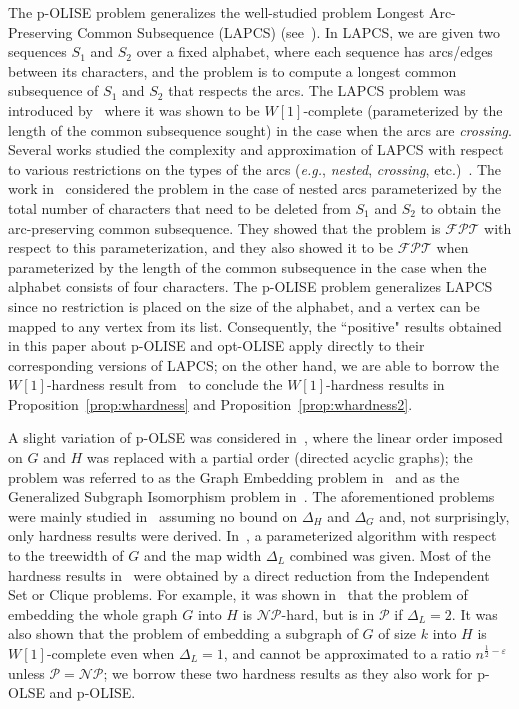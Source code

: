 \documentclass[11pt]{article}
\newcommand{\Pol}{\mbox{$\mathcal P$}}
\newcommand{\NP}{\mbox{$\mathcal{NP}$}}
\newcommand{\FPT}{\text{$\mathcal{FPT}$}}
\let\epsilon=\varepsilon
\def\eg{{\em e.g.}}
\begin{document}
The p-OLISE problem generalizes the well-studied problem {\sc Longest Arc-Preserving Common Subsequence} (LAPCS) (see~\cite{gramm,evansphd,evans,guo,guohuidam,guohui}).  In LAPCS, we are given two sequences $S_1$ and $S_2$ over a fixed alphabet, where each sequence has arcs/edges between its characters, and the problem is to compute a longest common subsequence of $S_1$ and $S_2$ that respects the arcs. The LAPCS problem was introduced by~\cite{evansphd,evans} where it was shown to be $W[1]$-complete (parameterized by the length of the common subsequence sought) in the case when the arcs are {\em crossing}. Several works studied the complexity and approximation of LAPCS with respect to various restrictions on the types of the arcs (\eg, {\em nested}, {\em crossing}, etc.)~\cite{gramm,evansphd,evans,guo,guohuidam,guohui}. The work in~\cite{gramm,guo} considered the problem in the case of nested arcs parameterized by the total number of characters that need to be deleted from $S_1$ and $S_2$ to obtain the arc-preserving common subsequence. They showed that the problem is $\FPT$ with respect to this parameterization, and they also showed it to be $\FPT$ when parameterized by the length of the common subsequence in the case when the alphabet consists of four characters. The p-OLISE problem generalizes LAPCS since no restriction is placed on the size of the alphabet, and a vertex can be mapped to any vertex from its list. Consequently, the ``positive" results obtained in this paper about p-OLISE and opt-OLISE apply directly to their corresponding versions of LAPCS; on the other hand, we are able to borrow the $W[1]$-hardness result from~\cite{evans} to conclude the $W[1]$-hardness results in Proposition~\ref{prop:whardness} and Proposition~\ref{prop:whardness2}.

A slight variation of p-OLSE was considered in~\cite{xiuzhen,xiuzhencai}, where the linear order imposed on $G$ and $H$ was replaced with a partial order (directed acyclic graphs); the problem was referred to as the {\sc Graph Embedding} problem in~\cite{xiuzhen} and as the {\sc Generalized Subgraph Isomorphism} problem in~\cite{xiuzhencai}. The aforementioned problems were mainly studied in~\cite{xiuzhen,xiuzhencai} assuming no bound on $\Delta_H$ and $\Delta_G$ and, not surprisingly, only hardness results were derived. In~\cite{xiuzhencai}, a parameterized algorithm with respect to the treewidth of $G$ and the map width $\Delta_L$ combined was given. Most of the hardness results in~\cite{xiuzhen,xiuzhencai} were obtained by a direct reduction from the {\sc Independent Set} or {\sc Clique} problems. For example, it was shown in~\cite{xiuzhen} that the problem of embedding the whole graph $G$ into $H$ is \NP-hard, but is in $\Pol$ if $\Delta_L=2$. It was also shown that the problem of embedding a subgraph of $G$ of size $k$ into $H$ is $W[1]$-complete even when $\Delta_L =1$, and cannot be approximated to a ratio $n^{\frac{1}{2} - \epsilon}$ unless $\Pol=\NP$; we borrow these two hardness results as they also work for p-OLSE and p-OLISE.
\end{document}
